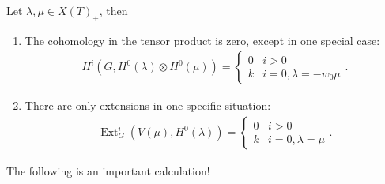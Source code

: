 \begin{theorem}[?]

Let \(\lambda, \mu \in X(T)_+\), then

\begin{enumerate}
\def\labelenumi{\arabic{enumi}.}
\item
  The cohomology in the tensor product is zero, except in one special
  case:
  \begin{align*}  
  H^i(G, H^0(\lambda) \otimes H^0(\mu))
  =
  \begin{cases}
  0 & i>0 \\
  k & i=0, \lambda = -w_0\mu
  \end{cases}
  .\end{align*}
\item
  There are only extensions in one specific situation:
  \begin{align*}  
  \operatorname{Ext}_G^i(V(\mu), H^0(\lambda)) = 
  \begin{cases}
  0 & i> 0 \\
  k & i=0, \lambda = \mu
  \end{cases}
  .\end{align*}
\end{enumerate}

\end{theorem}

The following is an important calculation!

